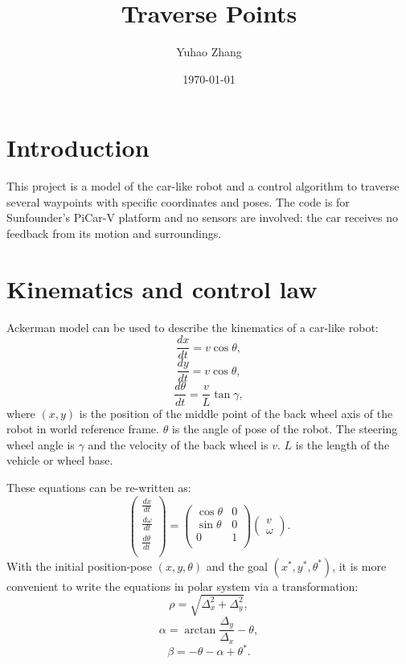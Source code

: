 \documentclass[12pt]{article}
\title{Traverse Points}
\author{Yuhao Zhang}
\date{\today}
\begin{document}
\maketitle


%
\section{Introduction}
This project is a model of the car-like robot and a control algorithm to traverse several waypoints with specific coordinates and poses. The code is for Sunfounder's PiCar-V platform and no sensors are involved: the car receives no feedback from its motion and surroundings.
\section{Kinematics and control law}
\label{kine}
Ackerman model can be used to describe the kinematics of a car-like robot: 
$$\frac{d x}{dt}=v\cos \theta,$$
$$\frac{d y}{dt}=v\cos \theta,$$
$$\frac{d \theta}{dt}=\frac{v}{L}\tan \gamma,$$
where $(x,y)$ is the position of the middle point of the back wheel axis of the robot in world reference frame. $\theta$ is the angle of pose of the robot. The steering wheel angle is $\gamma$ and the velocity of the back wheel is $v$. $L$ is the length of the vehicle or wheel base.

These equations can be re-written as:
$$
\begin{pmatrix}
\frac{d x}{dt} \\
\frac{d \omega}{dt} \\
\frac{d \theta}{dt} \\
\end{pmatrix}
=
\begin{pmatrix}
\cos \theta & 0 \\
\sin \theta & 0 \\
0 & 1\\
\end{pmatrix}
\begin{pmatrix}
v \\
\omega
\end{pmatrix}.
$$
With the initial position-pose $(x,y,\theta)$ and the goal $(x^*,y^*,\theta^*)$, it is more convenient to write the equations in polar system via a transformation:
$$\rho=\sqrt{\Delta_x^2+\Delta_y^2},$$
$$\alpha=\arctan \frac{\Delta_y}{\Delta_x}-\theta,$$
$$\beta=-\theta-\alpha+\theta^*.$$
\end{document}
